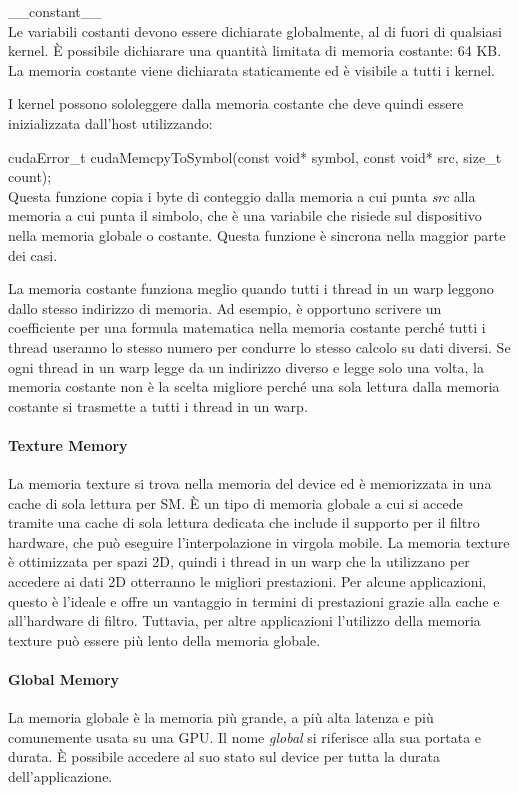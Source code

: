 \_\_constant\_\_ \\

Le variabili costanti devono essere dichiarate globalmente, al di fuori di qualsiasi kernel. È possibile dichiarare una quantità limitata di memoria costante: 64 KB. La memoria costante viene dichiarata staticamente ed è visibile a tutti i kernel.

I kernel possono sololeggere  dalla memoria costante che deve quindi essere inizializzata dall'host utilizzando:

cudaError\_t cudaMemcpyToSymbol(const void* symbol, const void* src, size\_t count);\\

Questa funzione copia i byte di conteggio dalla memoria a cui punta \emph{src} alla memoria a cui punta il simbolo, che è una variabile che risiede sul dispositivo nella memoria globale o costante. Questa funzione è sincrona nella maggior parte dei casi.

La memoria costante funziona meglio quando tutti i thread in un warp leggono dallo stesso indirizzo di memoria. Ad esempio, è opportuno scrivere un coefficiente per una formula matematica nella memoria costante perché tutti i thread useranno lo stesso numero per condurre lo stesso calcolo su dati diversi. Se ogni thread in un warp legge da un indirizzo diverso e legge solo una volta, la memoria costante non è la scelta migliore perché una sola lettura dalla memoria costante si trasmette a tutti i thread in un warp.

\paragraph{Texture Memory}
La memoria texture si trova nella memoria del device ed è memorizzata in una cache di sola lettura per SM. È un tipo di memoria globale a cui si accede tramite una cache di sola lettura dedicata che include il supporto per il filtro hardware, che può eseguire l'interpolazione in virgola mobile. La memoria texture è ottimizzata per spazi 2D, quindi i thread in un warp che la utilizzano per accedere ai dati 2D otterranno le migliori prestazioni. Per alcune applicazioni, questo è l'ideale e offre un vantaggio in termini di prestazioni grazie alla cache e all'hardware di filtro. Tuttavia, per altre applicazioni l'utilizzo della memoria texture può essere più lento della memoria globale.

\paragraph{Global Memory}
La memoria globale è la memoria più grande, a più alta latenza e più comunemente usata su una GPU. Il nome \emph{global} si riferisce alla sua portata e durata. È possibile accedere al suo stato sul device per tutta la durata dell'applicazione.

